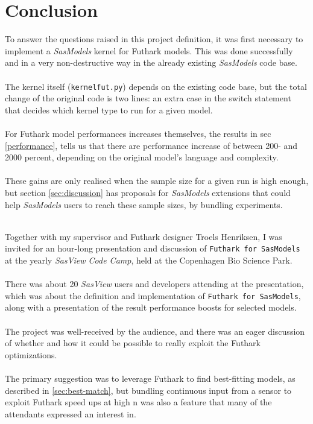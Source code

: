 \documentclass[11pt]{article}
\newcommand{\sasmodels}{\textit{SasModels}}
\newcommand{\sasview}{\textit{SasView}}
\newcommand{\futhark}{\texttt{Futhark for SasModels}}
\begin{document}
\section{Conclusion}
To answer the questions raised in this project definition, it was first
necessary to implement a \sasmodels{} kernel for Futhark models. This was done
successfully and in a very non-destructive way in the already existing
\sasmodels{} code base.
\\\\
The kernel itself (\texttt{kernelfut.py}) depends on the existing code base, but
the total change of the original code is two lines: an extra case in the
switch statement that decides which kernel type to run for a given model.
\\\\
For Futhark model performances increases themselves, the results in
sec \ref{performance}, tells us that there are performance increase of between
200- and 2000 percent, depending on the original model's language and
complexity.
\\\\
These gains are only realised when the sample size for a given run is high
enough, but section \ref{sec:discussion} has proposals for \sasmodels{} extensions
that could help \sasmodels{} users to reach these sample sizes, by bundling
experiments.
\\\\
\begin{mdframed}[
  frametitle={Presentation at \sasview{} Code Camp},
  nobreak=true
  ]
Together with my supervisor and Futhark designer Troels Henriksen,
I was invited for an hour-long presentation and discussion of \futhark{} at the
yearly \textit{SasView Code Camp}, held at the Copenhagen Bio Science Park.\\\\
There was about 20 \sasview{} users and developers attending at the presentation,
which was about the definition and implementation of \futhark{}, along with
a presentation of the result performance boosts for selected models.\\\\
The project was well-received by the audience, and there was an eager discussion
of whether and how it could be possible to really exploit the Futhark
optimizations.\\\\
The primary suggestion was to leverage Futhark to find best-fitting models,
as described in \ref{sec:best-match}, but bundling continuous input from
a sensor to exploit Futhark speed ups at high n was also a feature that many
of the attendants expressed an interest in.
\end{mdframed}
\end{document}
